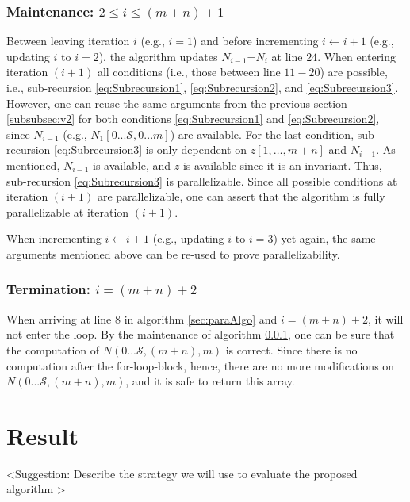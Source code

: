 \documentclass[a4paper,11pt]{article}
\begin{document}
\subsubsection{Maintenance: $2\leq i \leq (m+n)+1$}
\label{subsubsec:maintenance}
Between leaving iteration $i$ (e.g., $i=1$) and before incrementing $i\leftarrow i+1$ (e.g., updating $i$ to $i=2$), the algorithm updates $N_{i-1}$=$N_{i}$ at line $24$. When entering iteration $(i+1)$ all conditions (i.e., those between line $11-20$) are possible, i.e., sub-recursion \ref{eq:Subrecursion1}, \ref{eq:Subrecursion2}, and \ref{eq:Subrecursion3}. However, one can reuse the same arguments from the previous section \ref{subsubsec:v2} for both conditions \ref{eq:Subrecursion1} and \ref{eq:Subrecursion2}, since $N_{i-1}$ (e.g., $N_{1}[0...\mathcal{S},0...m]$) are available. For the last condition, sub-recursion \ref{eq:Subrecursion3} is only dependent on $z[1,\ldots,m+n]$ and $N_{i-1}$. As mentioned, $N_{i-1}$ is available, and $z$ is available since it is an invariant. Thus, sub-recursion \ref{eq:Subrecursion3} is parallelizable. Since all possible conditions at iteration $(i+1)$ are parallelizable, one can assert that the algorithm is fully parallelizable at iteration $(i+1)$.

When incrementing $i\leftarrow i+1$ (e.g., updating $i$ to $i=3$) yet again, the same arguments mentioned above can be re-used to prove parallelizability.

\subsubsection{Termination: $i=(m+n)+2$}
When arriving at line $8$ in algorithm \ref{sec:paraAlgo} and $i=(m+n)+2$, it will not enter the loop. By the maintenance of algorithm \ref{subsubsec:maintenance}, one can be sure that the computation of $N(0...\mathcal{S},(m+n),m)$ is correct. Since there is no computation after the for-loop-block, hence, there are no more modifications on $N(0...\mathcal{S},(m+n),m)$, and it is safe to return this array.



\section{Result}
\label{sec:result}

\textless Suggestion: Describe the strategy we will use to evaluate the proposed algorithm \textgreater
 
\end{document}
